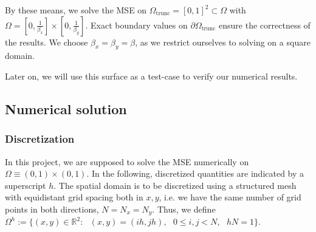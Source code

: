 \documentclass[11pt]{scrartcl}
\begin{document}
By these means, we solve the MSE on $\Omega_\text{trunc}=[0,1]^2\subset\Omega$ with $\Omega=[0,\frac{1}{\beta_x}]\times[0,\frac{1}{\beta_y}]$. Exact boundary values on $\partial\Omega_\text{trunc}$ ensure the correctness of the results. We choose $\beta_x=\beta_y=\beta$, as we restrict ourselves to solving on a square domain.

Later on, we will use this surface as a test-case to verify our numerical results.

\newpage
\subsection{Numerical solution}
\subsubsection{Discretization}
In this project, we are supposed to solve the MSE numerically on $\Omega \equiv (0,1)\times(0,1)$. In the following, discretized quantities are indicated by a superscript $h$. The spatial domain is to be discretized using a structured mesh with equidistant grid spacing both in $x,y$, i.e. we have the same number of grid points in both directions, $N=N_x=N_y$. Thus, we define $\Omega^h := \{ (x,y) \in \mathbb{R}^2:\text{ }(x,y) = (ih, jh), \text{ } 0 \le i,j < N,\text{ }hN=1\}$.
\end{document}
